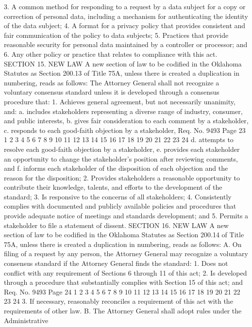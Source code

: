 3. A common method for responding to a request by a data
subject for a copy or correction of personal data, including a
mechanism for authenticating the identity of the data subject;
4. A format for a privacy policy that provides consistent and
fair communication of the policy to data subjects;
5. Practices that provide reasonable security for personal data
maintained by a controller or processor; and
6. Any other policy or practice that relates to compliance with
this act.
SECTION 15. NEW LAW A new section of law to be codified
in the Oklahoma Statutes as Section 200.13 of Title 75A, unless
there is created a duplication in numbering, reads as follows:
The Attorney General shall not recognize a voluntary consensus
standard unless it is developed through a consensus procedure that:
1. Achieves general agreement, but not necessarily unanimity,
and:
a. includes stakeholders representing a diverse range of
industry, consumer, and public interests,
b. gives fair consideration to each comment by a
stakeholder,
c. responds to each good-faith objection by a stakeholder,
Req. No. 9493 Page 23
1
2
3
4
5
6
7
8
9
10
11
12
13
14
15
16
17
18
19
20
21
22
23
24
d. attempts to resolve each good-faith objection by a
stakeholder,
e. provides each stakeholder an opportunity to change the
stakeholder's position after reviewing comments, and
f. informs each stakeholder of the disposition of each
objection and the reason for the disposition;
2. Provides stakeholders a reasonable opportunity to contribute
their knowledge, talents, and efforts to the development of the
standard;
3. Is responsive to the concerns of all stakeholders;
4. Consistently complies with documented and publicly available
policies and procedures that provide adequate notice of meetings and
standards development; and
5. Permits a stakeholder to file a statement of dissent.
SECTION 16. NEW LAW A new section of law to be codified
in the Oklahoma Statutes as Section 200.14 of Title 75A, unless
there is created a duplication in numbering, reads as follows:
A. On filing of a request by any person, the Attorney General may
recognize a voluntary consensus standard if the Attorney General finds
the standard:
1. Does not conflict with any requirement of Sections 6 through
11 of this act;
2. Is developed through a procedure that substantially complies
with Section 15 of this act; and
Req. No. 9493 Page 24
1
2
3
4
5
6
7
8
9
10
11
12
13
14
15
16
17
18
19
20
21
22
23
24
3. If necessary, reasonably reconciles a requirement of this act
with the requirements of other law.
B. The Attorney General shall adopt rules under the Administrative
